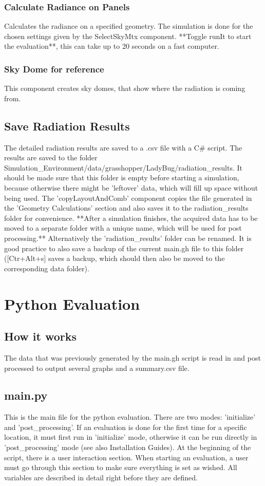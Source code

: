 {	\subsubsection{Calculate Radiance on Panels}
	Calculates the radiance on a specified geometry. The simulation is done for the chosen settings given by the SelectSkyMtx component. **Toggle runIt to start the evaluation**, this can take up to 20 seconds on a fast computer. 

	\subsubsection{Sky Dome for reference}
	This component creates sky domes, that show where the radiation is coming from. 



	\subsection{Save Radiation Results}
	The detailed radiation results are saved to a .csv file with a C# script. The results are saved to the folder Simulation_Environment/data/grasshopper/LadyBug/radiation_results. It should be made sure that this folder is empty before starting a simulation, because otherwise there might be 'leftover' data, which will fill up space without being used. The 'copyLayoutAndComb' component copies the file generated in the 'Geometry Calculations' section and also saves it to the radiation_results folder for convenience. **After a simulation finishes, the acquired data has to be moved to a separate folder with a unique name, which will be used for post processing.** Alternatively the 'radiation_results' folder can be renamed. It is good practice to also save a backup of the current main.gh file to this folder ([Ctr+Alt+s] saves a backup, which should then also be moved to the corresponding data folder). 


\section{Python Evaluation}

	\subsection{How it works}
	The data that was previously generated by the main.gh script is read in and post processed to output several graphs and a summary.csv file. 

	\subsection{main.py}
	This is the main file for the python evaluation. There are two modes: 'initialize' and 'post_processing'. If an evaluation is done for the first time for a specific location, it must first run in 'initialize' mode, otherwise it can be run directly in 'post_processing' mode (see also Installation Guides). 
	At the beginning of the script, there is a user interaction section. When starting an evaluation, a user must go through this section to make sure everything is set as wished. All variables are described in detail right before they are defined. 

}
